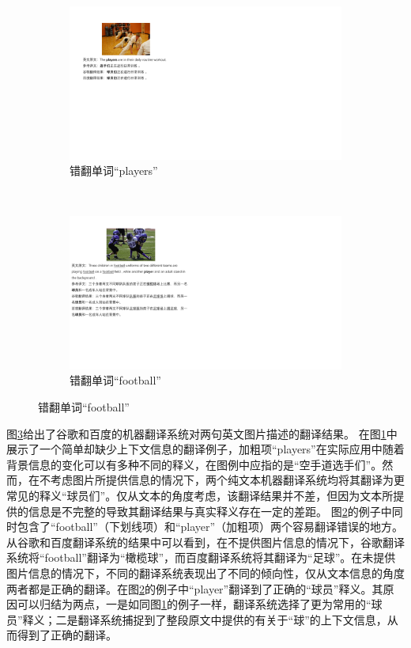\begin{figure}[!htp]
    \centering
    \begin{subfigure}[b]{1\linewidth}
      \centering
      \includegraphics[width=0.75\linewidth]{Img/fig_1_case_players.pdf}
      \caption{错翻单词“players”}
      \label{fig:1_players}
    \end{subfigure}%
    \\
    \begin{subfigure}[b]{\linewidth}
      \centering
      \includegraphics[width=\linewidth]{Img/fig_1_case_football.pdf}
      \caption{错翻单词“football”}
      \label{fig:1_football}
    \end{subfigure}
    \label{fig:1_translation_cases}
\end{figure}
图\ref{fig:1_translation_cases}给出了谷歌和百度的机器翻译系统对两句英文图片描述的翻译结果。
在图\ref{fig:1_players}中展示了一个简单却缺少上下文信息的翻译例子，加粗项“players”在实际应用中随着背景信息的变化可以有多种不同的释义，在图例中应指的是“空手道选手们”。然而，在不考虑图片所提供信息的情况下，两个纯文本机器翻译系统均将其翻译为更常见的释义“球员们”。仅从文本的角度考虑，该翻译结果并不差，但因为文本所提供的信息是不完整的导致其翻译结果与真实释义存在一定的差距。
图\ref{fig:1_football}的例子中同时包含了“football”（下划线项）和“player”（加粗项）两个容易翻译错误的地方。从谷歌和百度翻译系统的结果中可以看到，在不提供图片信息的情况下，谷歌翻译系统将“football”翻译为“橄榄球”，而百度翻译系统将其翻译为“足球”。在未提供图片信息的情况下，不同的翻译系统表现出了不同的倾向性，仅从文本信息的角度两者都是正确的翻译。在图\ref{fig:1_football}的例子中“player”翻译到了正确的“球员”释义。其原因可以归结为两点，一是如同图\ref{fig:1_players}的例子一样，翻译系统选择了更为常用的“球员”释义；二是翻译系统捕捉到了整段原文中提供的有关于“球”的上下文信息，从而得到了正确的翻译。

